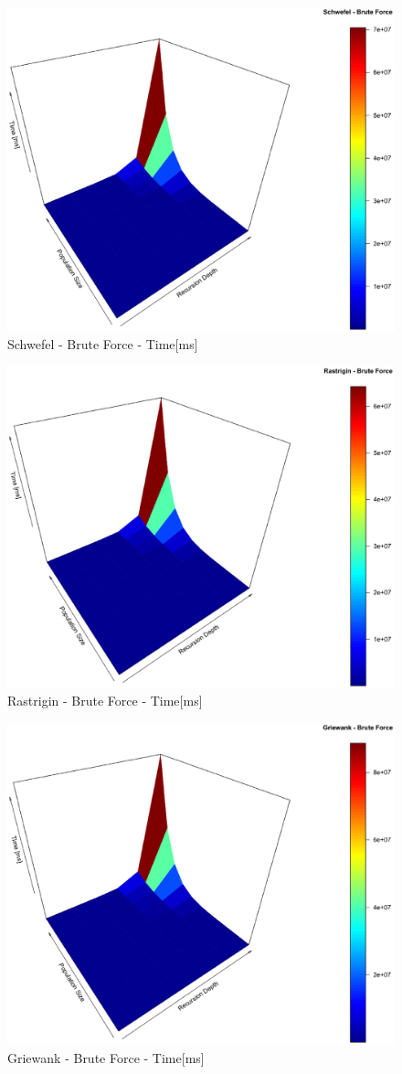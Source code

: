 \documentclass{svproc}
\begin{document}
\begin{figure}[tbp]
\centering
\includegraphics[width=1.0\hsize,height=0.65\hsize]{fig23.eps}
\caption{Schwefel - Brute Force - Time[ms]}
\label{fig18}
\end{figure}

\begin{figure}[tbp]
\centering
\includegraphics[width=1.0\hsize,height=0.65\hsize]{fig26.eps}
\caption{Rastrigin - Brute Force - Time[ms]}
\label{fig19}
\end{figure}

\begin{figure}[tbp]
\centering
\includegraphics[width=1.0\hsize,height=0.65\hsize]{fig29.eps}
\caption{Griewank - Brute Force - Time[ms]}
\label{fig20}
\end{figure}
\end{document}
